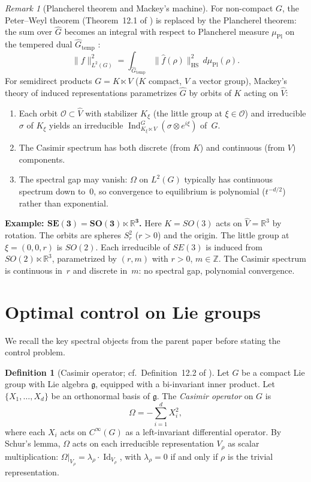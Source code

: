 \documentclass[12pt]{amsart}
\theoremstyle{definition}
\newtheorem{definition}[theorem]{Definition}
\theoremstyle{remark}
\newtheorem*{remark}{Remark}
\newcommand{\R}{\mathbb{R}}
\newcommand{\Z}{\mathbb{Z}}
\begin{document}
\begin{remark}[Plancherel theorem and Mackey's machine]
For non-compact $G$, the Peter--Weyl theorem (Theorem~12.1 of \cite{OCT}) is replaced by the Plancherel theorem: the sum over $\widehat{G}$ becomes an integral with respect to Plancherel measure $\mu_{\mathrm{Pl}}$ on the tempered dual $\widehat{G}_{\mathrm{temp}}$ \cite[Chapter~7]{Folland}:
\[
\|f\|_{L^2(G)}^2 = \int_{\widehat{G}_{\mathrm{temp}}} \|\widehat{f}(\rho)\|_{\mathrm{HS}}^2\, d\mu_{\mathrm{Pl}}(\rho).
\]
For semidirect products $G = K \ltimes V$ ($K$ compact, $V$ a vector group), Mackey's theory of induced representations \cite[Chapter~6]{Folland} parametrizes $\widehat{G}$ by orbits of $K$ acting on $\widehat{V}$:
\begin{enumerate}[label=(\roman*)]
\item Each orbit $\mathcal{O} \subset \widehat{V}$ with stabilizer $K_\xi$ (the little group at $\xi \in \mathcal{O}$) and irreducible $\sigma$ of $K_\xi$ yields an irreducible $\operatorname{Ind}_{K_\xi \ltimes V}^G(\sigma \otimes e^{i\xi})$ of~$G$.
\item The Casimir spectrum has both discrete (from $K$) and continuous (from $V$) components.
\item The spectral gap may vanish: $\Omega$ on $L^2(G)$ typically has continuous spectrum down to~$0$, so convergence to equilibrium is polynomial ($t^{-d/2}$) rather than exponential.
\end{enumerate}
\textbf{Example: $\boldsymbol{SE(3) = SO(3) \ltimes \R^3}$.} Here $K = SO(3)$ acts on $\widehat{V} = \R^3$ by rotation. The orbits are spheres $S^2_r$ ($r > 0$) and the origin. The little group at $\xi = (0,0,r)$ is $SO(2)$. Each irreducible of $SE(3)$ is induced from $SO(2) \ltimes \R^3$, parametrized by $(r, m)$ with $r > 0$, $m \in \Z$. The Casimir spectrum is continuous in~$r$ and discrete in~$m$: no spectral gap, polynomial convergence.
\end{remark}

\section{Optimal control on Lie groups}\label{sec:hjb}

We recall the key spectral objects from the parent paper before stating the control problem.

\begin{definition}[Casimir operator; cf.\ Definition~12.2 of {\cite{OCT}}]\label{def:casimir}
Let $G$ be a compact Lie group with Lie algebra $\mathfrak{g}$, equipped with a bi-invariant inner product. Let $\{X_1, \ldots, X_d\}$ be an orthonormal basis of $\mathfrak{g}$. The \emph{Casimir operator} on $G$ is
\[
\Omega = -\sum_{i=1}^d X_i^2,
\]
where each $X_i$ acts on $C^\infty(G)$ as a left-invariant differential operator. By Schur's lemma, $\Omega$ acts on each irreducible representation $V_\rho$ as scalar multiplication: $\Omega|_{V_\rho} = \lambda_\rho \cdot \operatorname{Id}_{V_\rho}$, with $\lambda_\rho = 0$ if and only if $\rho$ is the trivial representation.
\end{definition}
\end{document}
